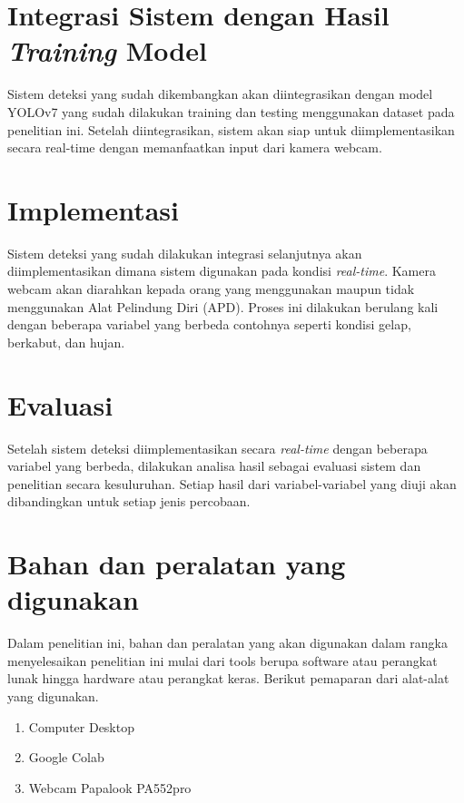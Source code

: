\section{Integrasi Sistem dengan Hasil \emph{Training} Model}
\label{subsec:integrasi}

Sistem deteksi yang sudah dikembangkan akan diintegrasikan dengan model YOLOv7 yang sudah dilakukan training dan testing menggunakan dataset pada penelitian ini. Setelah diintegrasikan, sistem akan siap untuk diimplementasikan secara real-time dengan memanfaatkan input dari kamera webcam.

\newpage

\section{Implementasi}
\label{subsec:implementasi}

Sistem deteksi yang sudah dilakukan integrasi selanjutnya akan diimplementasikan dimana sistem digunakan pada kondisi \textit{real-time}. Kamera webcam akan diarahkan kepada orang yang menggunakan maupun tidak menggunakan Alat Pelindung Diri (APD). Proses ini dilakukan berulang kali dengan beberapa variabel yang berbeda contohnya seperti kondisi gelap, berkabut, dan hujan.

\section{Evaluasi}
\label{subsec:evaluasi}

Setelah sistem deteksi diimplementasikan secara \emph{real-time} dengan beberapa variabel yang berbeda, dilakukan analisa hasil sebagai evaluasi sistem dan penelitian secara kesuluruhan. Setiap hasil dari variabel-variabel yang diuji akan dibandingkan untuk setiap jenis percobaan.

\section{Bahan dan peralatan yang digunakan}
\label{subsec:peralatan}

Dalam penelitian ini, bahan dan peralatan yang akan digunakan dalam rangka menyelesaikan penelitian ini mulai dari tools berupa software atau perangkat lunak hingga hardware atau perangkat keras. Berikut pemaparan dari alat-alat yang digunakan.

\begin{enumerate}[nolistsep]
  \item Computer Desktop
  \item Google Colab
  \item Webcam Papalook PA552pro
\end{enumerate}

